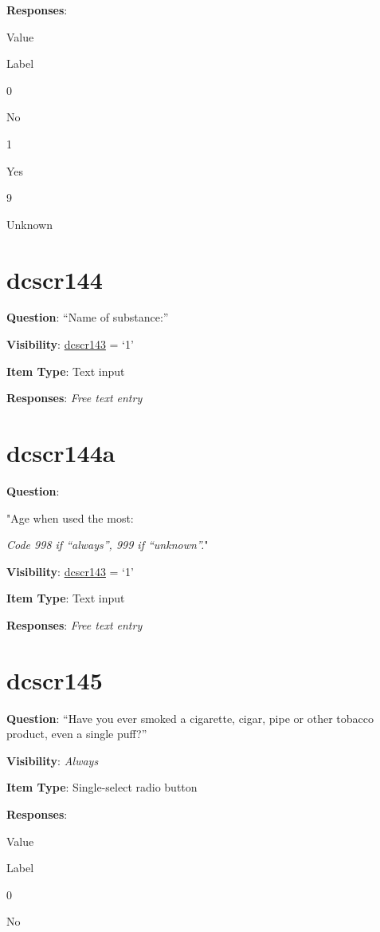 \documentclass[]{book}
\begin{document}
\textbf{Responses}:

Value

Label

0

No

1

Yes

9

Unknown

\hypertarget{dcscr144}{%
\section{dcscr144}\label{dcscr144}}

\textbf{Question}: ``Name of substance:''

\textbf{Visibility}: \protect\hyperlink{dcscr143}{dcscr143} = `1'

\textbf{Item Type}: Text input

\textbf{Responses}: \emph{Free text entry}

\hypertarget{dcscr144a}{%
\section{dcscr144a}\label{dcscr144a}}

\textbf{Question}:

"Age when used the most:

\emph{Code 998 if ``always'', 999 if ``unknown''.}"

\textbf{Visibility}: \protect\hyperlink{dcscr143}{dcscr143} = `1'

\textbf{Item Type}: Text input

\textbf{Responses}: \emph{Free text entry}

\hypertarget{dcscr145}{%
\section{dcscr145}\label{dcscr145}}

\textbf{Question}: ``Have you ever smoked a cigarette, cigar, pipe or other tobacco product, even a single puff?''

\textbf{Visibility}: \emph{Always}

\textbf{Item Type}: Single-select radio button

\textbf{Responses}:

Value

Label

0

No
\end{document}
